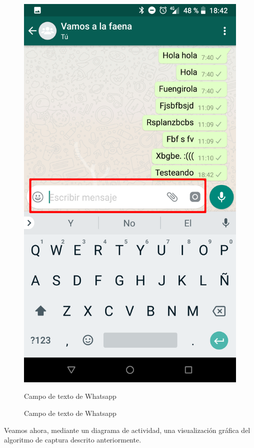 \documentclass[12pt,a4paper,oneside]{book} %
\begin{document}
\begin{itemize}
\begin{figure}[H]
\begin{center}
     	\includegraphics[scale=0.15]{pictures/IRL/whatsapp/whatsapp_text.png}
	    	\caption{Campo de texto de Whatsapp}{Campo de texto de Whatsapp}
    	\label{fig:Whatsapp editText widget}
	\end{center}
\end{figure}
\end{itemize}
Veamos ahora, mediante un diagrama de actividad, una visualización gráfica del algoritmo de captura descrito anteriormente. 
\end{document}
